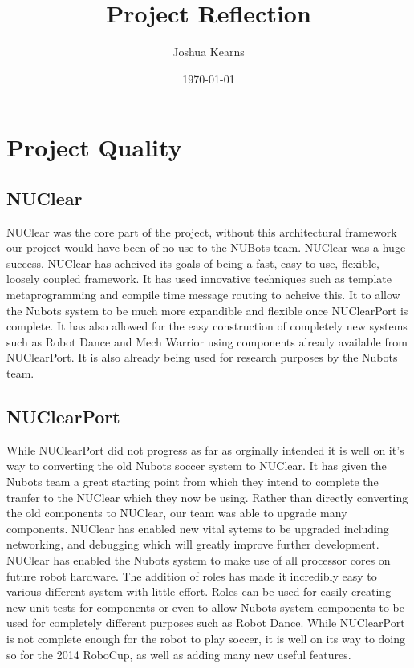 \documentclass[a4paper]{article}
\title{Project Reflection}
\author{Joshua Kearns}
\date{\today}
\begin{document}
\maketitle

\clearpage
\tableofcontents
\clearpage

\section{Project Quality}
	\subsection{NUClear}
		NUClear was the core part of the project, without this architectural framework our project would have been of no use to the NUBots team. NUClear was a huge success. NUClear has acheived its goals of being a fast, easy to use, flexible, loosely coupled framework. It has used innovative techniques such as template metaprogramming and compile time message routing to acheive this. It to allow the Nubots system to be much more expandible and flexible once NUClearPort is complete. It has also allowed for the easy construction of completely new systems such as Robot Dance and Mech Warrior using components already available from NUClearPort. It is also already being used for research purposes by the Nubots team.
	\subsection{NUClearPort}
		While NUClearPort did not progress as far as orginally intended it is well on it's way to converting the old Nubots soccer system to NUClear. It has given the Nubots team a great starting point from which they intend to complete the tranfer to the NUClear which they now be using. Rather than directly converting the old components to NUClear, our team was able to upgrade many components. NUClear has enabled new vital sytems to be upgraded including networking, and debugging which will greatly improve further development. NUClear has enabled the Nubots system to make use of all processor cores on future robot hardware. The addition of roles has made it incredibly easy to various different system with little effort. Roles can be used for easily creating new unit tests for components or even to allow Nubots system components to be used for completely different purposes such as Robot Dance. While NUClearPort is not complete enough for the robot to play soccer, it is well on its way to doing so for the 2014 RoboCup, as well as adding many new useful features.
\end{document}
